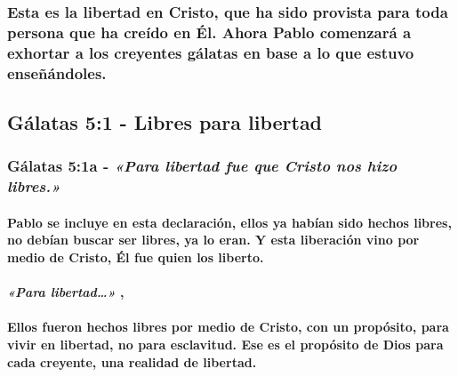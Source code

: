\documentclass[11a pt,twoside]{article}
\newcommand{\scripture}[1]{%
  {\fontsize{12pt}{16pt}\selectfont\ScriptureFont\itshape #1}%
}
\let\oldsubsection\subsection
\renewcommand{\subsection}{\needspace{5\baselineskip}\oldsubsection}
\let\oldsubsubsection\subsubsection
\renewcommand{\subsubsection}{\needspace{4\baselineskip}\oldsubsubsection}
\let\oldparagraph\paragraph
\renewcommand{\paragraph}{\needspace{3\baselineskip}\oldparagraph}
\begin{document}
\subsubsection{Esta es la libertad en Cristo, que ha sido provista para
toda persona que ha creído en Él. Ahora Pablo comenzará a exhortar a los
creyentes gálatas en base a lo que estuvo
enseñándoles.}\label{esta-es-la-libertad-en-cristo-que-ha-sido-provista-para-toda-persona-que-ha-creuxeddo-en-uxe9l.-ahora-pablo-comenzaruxe1-a-exhortar-a-los-creyentes-guxe1latas-en-base-a-lo-que-estuvo-enseuxf1uxe1ndoles.}

\subsection{Gálatas 5:1 - Libres para
libertad}\label{guxe1latas-51---libres-para-libertad}

\subsubsection{\texorpdfstring{Gálatas 5:1a -
\scripture{«Para libertad fue que Cristo nos hizo libres.»}}{Gálatas 5:1a - }}\label{guxe1latas-51a---para-libertad-fue-que-cristo-nos-hizo-libres.}

\paragraph{Pablo se incluye en esta declaración, ellos ya habían sido
hechos libres, no debían buscar ser libres, ya lo eran. Y esta
liberación vino por medio de Cristo, Él fue quien los
liberto.}\label{pablo-se-incluye-en-esta-declaraciuxf3n-ellos-ya-habuxedan-sido-hechos-libres-no-debuxedan-buscar-ser-libres-ya-lo-eran.-y-esta-liberaciuxf3n-vino-por-medio-de-cristo-uxe9l-fue-quien-los-liberto.}

\paragraph{\texorpdfstring{\scripture{«Para libertad…»},}{,}}\label{para-libertad}

\paragraph{Ellos fueron hechos libres por medio de Cristo, con un
propósito, para vivir en libertad, no para esclavitud. Ese es el
propósito de Dios para cada creyente, una realidad de
libertad.}\label{ellos-fueron-hechos-libres-por-medio-de-cristo-con-un-propuxf3sito-para-vivir-en-libertad-no-para-esclavitud.-ese-es-el-propuxf3sito-de-dios-para-cada-creyente-una-realidad-de-libertad.}
\end{document}
